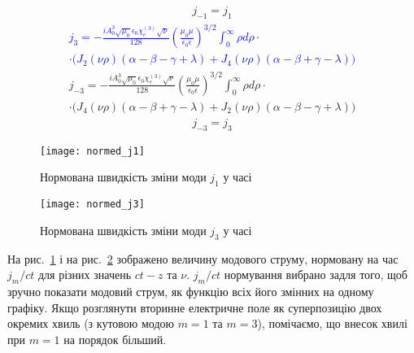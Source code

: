 %
\begin{equation} \begin{aligned}
j_{-1} = j_{1}
\end{aligned} \end{equation}
%
\textcolor{blue} { \begin{equation*} \begin{aligned}
j_{3} = - \frac{i A_0^3 \sqrt{\mu_0} \epsilon_0 \chi_e^{(3)} \sqrt{\nu}}{128}
\left( \frac{\mu_0 \mu}{\epsilon_0 \epsilon} \right)^{3/2}
\int_0^\infty \rho d \rho \cdot \\ \cdot
\Big( J_2 (\nu \rho) ( \alpha - \beta - \gamma + \lambda) + 
J_4 (\nu \rho) ( \alpha - \beta + \gamma - \lambda) \Big)
\end{aligned} \end{equation*} }
%
\begin{equation*} \begin{aligned}
j_{-3} = - \frac{i A_0^3 \sqrt{\mu_0} \epsilon_0 \chi_e^{(3)} \sqrt{\nu}}{128}
\left( \frac{\mu_0 \mu}{\epsilon_0 \epsilon} \right)^{3/2}
\int_0^\infty \rho d \rho \cdot \\ \cdot
\Big( J_4 (\nu \rho) ( \alpha - \beta + \gamma - \lambda) + 
J_2 (\nu \rho) ( \alpha - \beta - \gamma + \lambda) \Big)
\end{aligned} \end{equation*}
%
\begin{equation} \begin{aligned}
j_{-3} = j_{3}
\end{aligned} \end{equation}

\begin{figure}[htbp] \begin{center}
\texttt{[image: normed\_j1]}
\caption{Нормована швидкість зміни моди $ j_1 $ у часі} \label{fig:mode1}
\end{center} \end{figure}

\begin{figure}[htbp] \begin{center}
\texttt{[image: normed\_j3]}
\caption{Нормована швидкість зміни моди $ j_3 $ у часі} \label{fig:mode3}
\end{center} \end{figure}

На рис.~\ref{fig:mode1} і на рис.~\ref{fig:mode3} зображено величину модового 
струму, нормовану на час $ j_m / ct $ для різних значень $ ct-z $ та $ \nu $.
$ j_m / ct $ нормування вибрано задля того, щоб зручно показати модовий 
струм, як функцію всіх його змінних на одному графіку. Якщо розглянути вторинне
електричне поле як суперпозицію двох окремих хвиль (з кутовою модою $ m = 1 $ 
та $ m = 3 $), помічаємо, що внесок хвилі при $ m = 1 $ на порядок більший.

